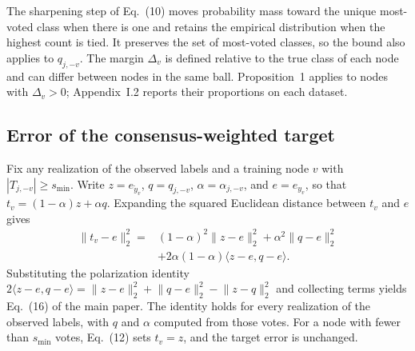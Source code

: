 \documentclass[10pt,letterpaper,nopreprintline]{elsarticle}
\begin{document}
The sharpening step of Eq.~(10) moves probability mass toward the unique most-voted class when there is one and retains the empirical distribution when the highest count is tied. It preserves the set of most-voted classes, so the bound also applies to \(q_{j,-v}\). The margin \(\Delta_v\) is defined relative to the true class of each node and can differ between nodes in the same ball. Proposition~1 applies to nodes with \(\Delta_v>0\); Appendix~I.2 reports their proportions on each dataset.

\subsection{Error of the consensus-weighted target}\label{sec:H.2}

Fix any realization of the observed labels and a training node \(v\) with \(|T_{j,-v}|\geq s_{\min}\). Write \(z=e_{\widetilde y_v}\), \(q=q_{j,-v}\), \(\alpha=\alpha_{j,-v}\), and \(e=e_{y_v}\), so that \(t_v=(1-\alpha)z+\alpha q\). Expanding the squared Euclidean distance between \(t_v\) and \(e\) gives
\begin{equation}\label{eq:H.4}
\begin{aligned}
\lVert t_v-e\rVert_2^2={}&(1-\alpha)^2\lVert z-e\rVert_2^2+\alpha^2\lVert q-e\rVert_2^2\\
&+2\alpha(1-\alpha)\langle z-e,q-e\rangle.
\end{aligned}
\end{equation}
Substituting the polarization identity \(2\langle z-e,q-e\rangle=\lVert z-e\rVert_2^2+\lVert q-e\rVert_2^2-\lVert z-q\rVert_2^2\) and collecting terms yields Eq.~(16) of the main paper. The identity holds for every realization of the observed labels, with \(q\) and \(\alpha\) computed from those votes. For a node with fewer than \(s_{\min}\) votes, Eq.~(12) sets \(t_v=z\), and the target error is unchanged.
\end{document}
